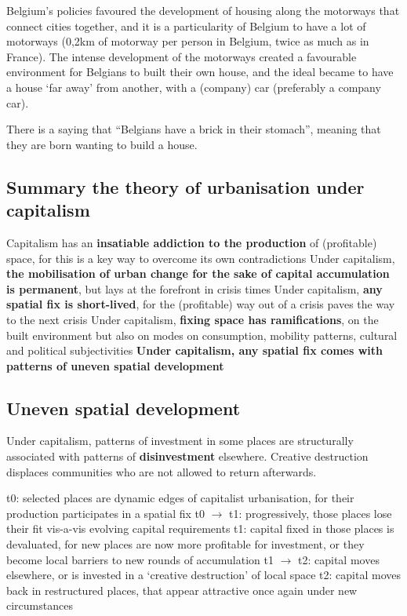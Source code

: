 \documentclass{article}
\begin{document}
Belgium's policies favoured the development of housing along the motorways that connect cities together, and it is a particularity of Belgium to have a lot of motorways (0,2km of motorway per person in Belgium, twice as much as in France). The intense development of the motorways created a favourable environment for Belgians to built their own house, and the ideal became to have a house `far away' from another, with a (company) car (preferably a company car). 

There is a saying that ``Belgians have a brick in their stomach'', meaning that they are born wanting to build a house.

\subsection{Summary the theory of urbanisation under capitalism}

\begin{outline}
	\1 Capitalism has an \textbf{insatiable addiction to the production} of (profitable) space, for this is a key way to overcome its own contradictions
	\1Under capitalism, \textbf{the mobilisation of urban change for the sake of capital accumulation is permanent}, but lays at the forefront in crisis times
	\1 Under capitalism, \textbf{any spatial fix is short-lived}, for the (profitable) way out of a crisis paves the way to the next crisis
	\1 Under capitalism, \textbf{fixing space has ramifications}, on the built environment but also on modes on consumption, mobility patterns, cultural and political subjectivities
	\1 \textbf{Under capitalism, any spatial fix comes with patterns of uneven spatial development}
\end{outline}

\subsection{Uneven spatial development}

Under capitalism, patterns of investment in some places are structurally associated with patterns of \textbf{disinvestment} elsewhere. Creative destruction displaces communities who are not allowed to return afterwards.

\begin{outline} 
	\1 t0: selected places are dynamic edges of capitalist urbanisation, for their production participates in a spatial fix
	\1 t0 $\rightarrow$ t1: progressively, those places lose their fit vis-a-vis evolving capital requirements
	\1 t1: capital fixed in those places is devaluated, for new places are now more profitable for investment, or they become local barriers to new rounds of accumulation
	\1 t1 $\rightarrow$ t2: capital moves elsewhere, or is invested in a `creative destruction' of local space
	\1 t2: capital moves back in restructured places, that appear attractive once again under new circumstances
\end{outline}
\end{document}
